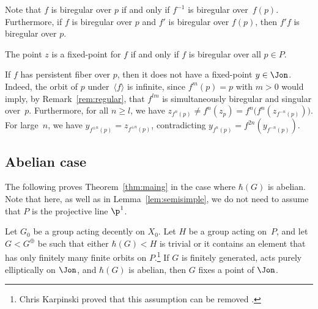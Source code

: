 \begin{remark}
\label{rem:regular}
Note that $f$ is biregular over $p$ if and only if $f^{-1}$ is biregular over~$f(p)$. Furthermore, if $f$ is biregular over $p$ and $f'$ is biregular over $f(p)$, then $f'f$ is biregular over $p$.
\end{remark}

\begin{remark}
\label{rem:fixed}
The point $z$ is a fixed-point for $f$ if and only if $f$ is biregular over all $p\in P$.
\end{remark}

\begin{remark}
\label{rem:per}
If $f$ has persistent fiber over $p$, then it does not have a fixed-point $y\in \Jon$. Indeed, the orbit of $p$ under~$\langle f\rangle$ is infinite, since $f^m(p)=p$ with $m>0$ would imply, by Remark~\ref{rem:regular}, that $f^{l m}$ is simultaneously biregular and singular over~$p$. Furthermore, for all $n\geq l$, we have $z_{f^{n}(p)}\neq f^{n}(z_p)=f^n\big(f^n(z_{f^{-n}(p)})\big)$.
For large~$n$, we have $y_{f^{\pm n}(p)}=z_{f^{\pm n}(p)}$, contradicting $y_{f^{n}(p)}=f^{2n}(y_{f^{-n}(p)})$.
\end{remark}

\subsection{Abelian case}

The following proves Theorem~\ref{thm:maing} in the case where $\hbar(G)$ is abelian. Note that here, as well as in Lemma~\ref{lem:semisimple}, we do not need to assume that $P$ is the projective line $\p^1$.

\begin{lemma}
\label{lem:abel}
Let $G_0$ be a group acting decently on $X_0$. Let $H$ be a group acting on~$P$, and let $G<G^\oplus$ be such that either $\hbar(G)<H$ is trivial or it contains an element that has only finitely many finite orbits on $P$.\footnote{Chris Karpinski proved that this assumption can be removed \cite{Karpinski24}.} If $G$ is finitely generated, acts purely elliptically on $\Jon$, and $\hbar(G)$ is abelian, then $G$ fixes a point of $\Jon$.
\end{lemma}

